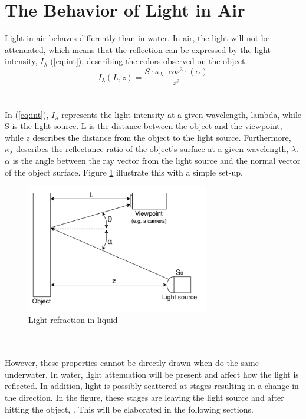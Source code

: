 \section{The Behavior of Light in Air}
Light in air behaves differently than in water. In air, the light will not be attenuated, which means that the reflection can be expressed by the light intensity, $I_ {\lambda}$ (\ref{eq:int}), describing the colors observed on the object.
\begin{equation} \label{eq:int}
    I_ {\lambda} (L, z) = \frac{S \cdot \kappa_{\lambda}\cdot cos^{3}\cdot (\alpha)}{z^2}
\end{equation}
\\\\
In (\ref{eq:int}), $I_{\lambda}$ represents the light intensity at a given wavelength, lambda, while S is the light source. L is the distance between the object and the viewpoint, while z describes the distance from the object to the light source. Furthermore, $\kappa_{\lambda}$ describes the reflectance ratio of the object's surface at a given wavelength, $\lambda$. $\alpha$ is the angle between the ray vector from the light source and the normal vector of the object surface. Figure \ref{fig:reflectance} illustrate this with a simple set-up.
\begin{figure}[H]
\centering
  \includegraphics[width=8cm]{Images/theory/reflectance.png}
  \caption[Light Refraction in Liquid]{Light refraction in liquid}
  \label{fig:reflectance}
\end{figure}
\\\\
\noindent
However, these properties cannot be directly drawn when do the same underwater. In water, light attenuation will be present and affect how the light is reflected. In addition, light is possibly scattered at stages resulting in a change in the direction. In the figure, these stages are leaving the light source and after hitting the object, \cite{sorensen2018}. This will be elaborated in the following sections.

